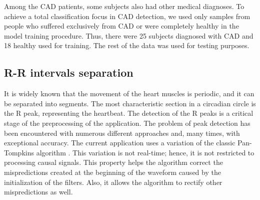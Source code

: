 Among the CAD patients, some subjects also had other medical diagnoses. To achieve a total classification focus in CAD detection, we used only samples from people who suffered exclusively from CAD or were completely healthy in the model training procedure. Thus, there were 25 subjects diagnosed with CAD and 18 healthy used for training. The rest of the data was used for testing purposes. 
%
\subsection{R-R intervals separation}
\label{ssec:RR_intervals_separation}
It is widely known that the movement of the heart muscles is periodic, and it can be separated into segments. The most characteristic section in a circadian circle is the R peak, representing the heartbeat. The detection of the R peaks is a critical stage of the preprocessing of the application. The problem of peak detection has been encountered with numerous different approaches and, many times, with exceptional accuracy. 
The current application uses a variation of the classic Pan-Tompkins algorithm \cite{pan_tompkins, sedghamiz2018biosigkit}. This variation is not real-time; hence, it is not restricted to processing causal signals. This property helps the algorithm correct the mispredictions created at the beginning of the waveform caused by the initialization of the filters. Also, it allows the algorithm to rectify other mispredictions as well.

